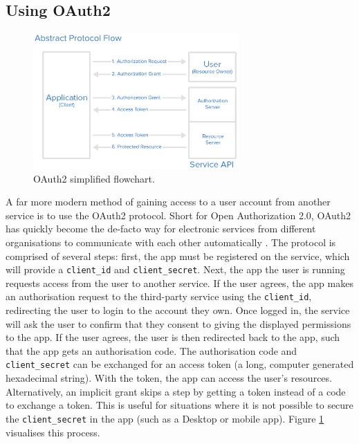 \documentclass[11pt]{article}
\begin{document}
\subsection{Using OAuth2}

\begin{figure}[b!]
    \centering
    \includegraphics[width=0.7\textwidth]{figures/oauth_abstract_flow.png}
    \caption{OAuth2 simplified flowchart.}
    \label{fig:oauth-flowchart}
\end{figure}

A far more modern method of gaining access to a user account from another service is to use the OAuth2 protocol. Short for Open Authorization 2.0, OAuth2 has quickly become the de-facto way for electronic services from different organisations to communicate with each other automatically \cite{oauth2}. The protocol is comprised of several steps: first, the app must be registered on the service, which will provide a \texttt{client\_id} and \texttt{client\_secret}. Next, the app the user is running requests access from the user to another service. If the user agrees, the app makes an authorisation request to the third-party service using the \texttt{client\_id}, redirecting the user to login to the account they own. Once logged in, the service will ask the user to confirm that they consent to giving the displayed permissions to the app. If the user agrees, the user is then redirected back to the app, such that the app gets an authorisation code. The authorisation code and \texttt{client\_secret} can be exchanged for an access token (a long, computer generated hexadecimal string). With the token, the app can access the user's resources. Alternatively, an implicit grant skips a step by getting a token instead of a code to exchange a token. This is useful for situations where it is not possible to secure the \texttt{client\_secret} in the app (such as a Desktop or mobile app). Figure \ref{fig:oauth-flowchart} visualises this process.
\end{document}
